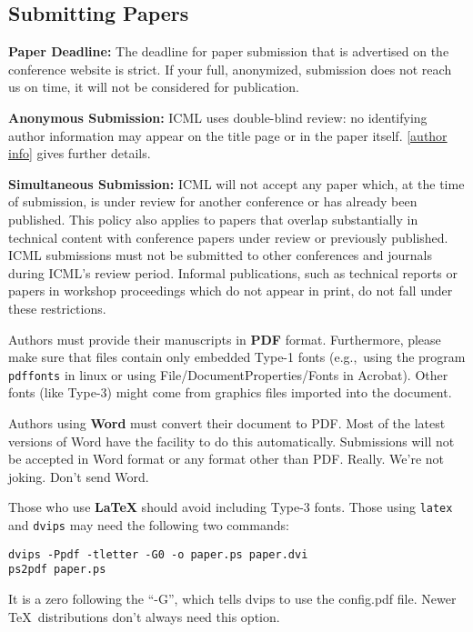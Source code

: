 \subsection{Submitting Papers}

\textbf{Paper Deadline:} The deadline for paper submission that is
advertised on the conference website is strict. If your full,
anonymized, submission does not reach us on time, it will not be
considered for publication. 

\textbf{Anonymous Submission:} ICML uses double-blind review: no identifying
author information may appear on the title page or in the paper
itself. \cref{author info} gives further details.

\textbf{Simultaneous Submission:} ICML will not accept any paper which,
at the time of submission, is under review for another conference or
has already been published. This policy also applies to papers that
overlap substantially in technical content with conference papers
under review or previously published. ICML submissions must not be
submitted to other conferences and journals during ICML's review
period.
Informal publications, such as technical
reports or papers in workshop proceedings which do not appear in
print, do not fall under these restrictions.

\medskip

Authors must provide their manuscripts in \textbf{PDF} format.
Furthermore, please make sure that files contain only embedded Type-1 fonts
(e.g.,~using the program \texttt{pdffonts} in linux or using
File/DocumentProperties/Fonts in Acrobat). Other fonts (like Type-3)
might come from graphics files imported into the document.

Authors using \textbf{Word} must convert their document to PDF\@. Most
of the latest versions of Word have the facility to do this
automatically. Submissions will not be accepted in Word format or any
format other than PDF\@. Really. We're not joking. Don't send Word.

Those who use \textbf{\LaTeX} should avoid including Type-3 fonts.
Those using \texttt{latex} and \texttt{dvips} may need the following
two commands:

{\footnotesize
\begin{verbatim}
dvips -Ppdf -tletter -G0 -o paper.ps paper.dvi
ps2pdf paper.ps
\end{verbatim}}
It is a zero following the ``-G'', which tells dvips to use
the config.pdf file. Newer \TeX\ distributions don't always need this
option.

